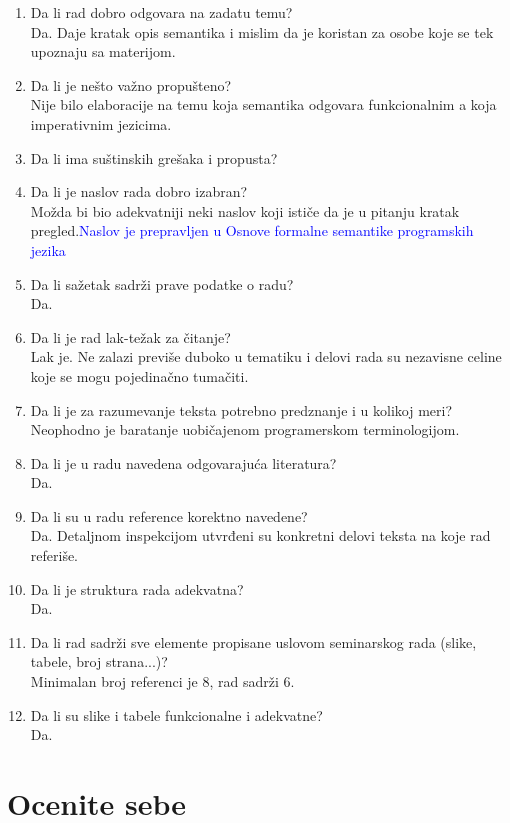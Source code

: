 \documentclass[a4paper]{report}
\newcommand{\odgovor}[1]{\textcolor{blue}{#1}}
\begin{document}
\begin{enumerate}
\item Da li rad dobro odgovara na zadatu temu?\\
Da. Daje kratak opis semantika i mislim da je koristan za osobe koje se tek upoznaju sa materijom.
\item Da li je nešto važno propušteno?\\
Nije bilo elaboracije na temu koja semantika odgovara funkcionalnim a koja imperativnim jezicima. 
\item Da li ima suštinskih grešaka i propusta?\\
\item Da li je naslov rada dobro izabran?\\
Možda bi bio adekvatniji neki naslov koji ističe da je u pitanju kratak pregled.\odgovor{Naslov je prepravljen u Osnove formalne semantike programskih jezika}
\item Da li sažetak sadrži prave podatke o radu?\\
Da.
\item Da li je rad lak-težak za čitanje?\\
Lak je. Ne zalazi previše duboko u tematiku i delovi rada su nezavisne celine koje se mogu pojedinačno tumačiti.
\item Da li je za razumevanje teksta potrebno predznanje i u kolikoj meri?\\
Neophodno je baratanje uobičajenom programerskom terminologijom.
\item Da li je u radu navedena odgovarajuća literatura?\\
Da.
\item Da li su u radu reference korektno navedene?\\
Da. Detaljnom inspekcijom utvrđeni su konkretni delovi teksta na koje rad referiše.
\item Da li je struktura rada adekvatna?\\
Da.
\item Da li rad sadrži sve elemente propisane uslovom seminarskog rada (slike, tabele, broj strana...)?\\
Minimalan broj referenci je 8, rad sadrži 6.
\item Da li su slike i tabele funkcionalne i adekvatne?\\
Da.
\end{enumerate}

\section{Ocenite sebe}
\end{document}
